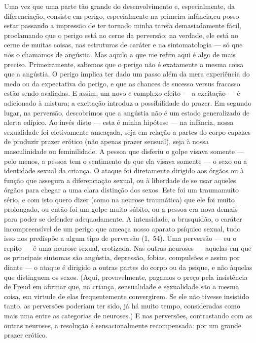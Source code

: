 Uma vez que uma parte tão grande do desenvolvimento e,
especialmente, da diferenciação, consiste em perigo, especialmente na
primeira infância,\idxinfanperig[|(] eu posso estar passando a impressão de ter tornado
minha tarefa demasiadamente fácil, proclamando que o perigo está no
cerne da perversão; na verdade, ele está no cerne de muitas coisas, nas
estruturas de caráter e na sintomatologia --- só que nós o chamamos de
angústia.\idxangu{} Mas aquilo a que me refiro aqui é algo de mais preciso.
Primeiramente, sabemos que o perigo não é exatamente a mesma coisa que
a angústia. O perigo implica ter dado um passo além da mera experiência
do medo ou da expectativa do perigo, e que as chances de sucesso
versus fracasso estão sendo avaliadas. E assim, um novo e complexo
efeito --- a excitação --- é adicionado à mistura; a excitação
introduz a possibilidade do prazer. Em segundo lugar, na perversão,
descobrimos que a angústia não é um estado generalizado de alerta
edípico. Ao invés disto --- esta é minha hipótese --- na infância,
nossa sexualidade foi efetivamente ameaçada, seja em relação a partes
do corpo capazes de produzir prazer erótico (não apenas prazer
sensual), seja à nossa masculinidade ou feminilidade. A pessoa que
disferiu o golpe visava somente --- pelo menos, a pessoa tem o
sentimento de que ela visava somente --- o sexo ou a identidade
sexual\idxiden{} da criança. O ataque foi diretamente dirigido aos órgãos ou à
função que assegura a diferenciação sexual, ou à liberdade de se usar
aqueles órgãos para chegar a uma clara distinção dos sexos. Este foi um
trauma\idxtrauma[|(] muito sério, e com isto quero dizer (como na neurose traumática)
que ele foi muito prolongado, ou então foi um golpe muito súbito, ou a
pessoa era nova demais para poder se defender adequadamente. A
intensidade, a brusquidão, o caráter incompreensível de um perigo que
ameaça nosso aparato psíquico sexual, tudo isso nos predispõe a algum
tipo de perversão (1,~54). Uma perversão --- eu o repito --- é uma
neurose\idxpervneuro{} sexual, erotizada. Nas outras neuroses --- aquelas em que os
principais sintomas são angústia, depressão, fobias, compulsões e assim
por diante --- o ataque é dirigido a outras partes do corpo ou da
psique, e não àquelas que distinguem os sexos. (Aqui, provavelmente,
pagamos o preço pela insistência de Freud\idxfreudsexua{} em afirmar que, na criança,
sensualidade e sexualidade\idxsexuateo{} são a mesma coisa, em virtude de elas
frequentemente convergirem. Se ele não tivesse insistido tanto, as
perversões poderiam ter sido, já há muito tempo, consideradas como mais
uma entre as categorias de neuroses.) E nas perversões, contrastando
com as outras neuroses, a resolução é sensacionalmente recompensada:
por um grande prazer erótico.

